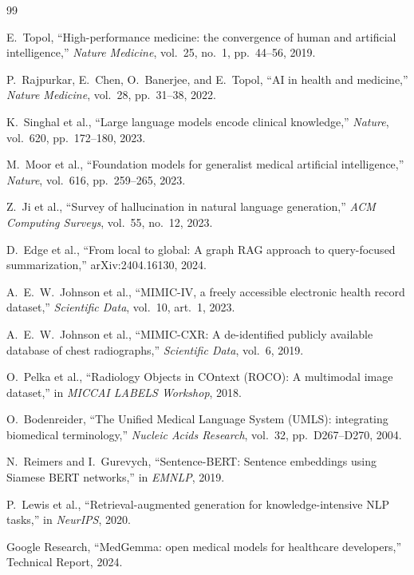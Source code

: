 \documentclass[twocolumn,10pt,main=USenglish]{asmeconf}
\begin{document}
\begin{thebibliography}{99}
\small

E.~Topol, ``High-performance medicine: the convergence of human and
artificial intelligence,'' \emph{Nature Medicine}, vol.~25, no.~1,
pp.~44--56, 2019.

P.~Rajpurkar, E.~Chen, O.~Banerjee, and E.~Topol, ``AI in health and
medicine,'' \emph{Nature Medicine}, vol.~28, pp.~31--38, 2022.

K.~Singhal et al., ``Large language models encode clinical knowledge,''
\emph{Nature}, vol.~620, pp.~172--180, 2023.

M.~Moor et al., ``Foundation models for generalist medical artificial
intelligence,'' \emph{Nature}, vol.~616, pp.~259--265, 2023.

Z.~Ji et al., ``Survey of hallucination in natural language
generation,'' \emph{ACM Computing Surveys}, vol.~55, no.~12, 2023.

D.~Edge et al., ``From local to global: A graph RAG approach to
query-focused summarization,'' arXiv:2404.16130, 2024.

A.~E.~W.~Johnson et al., ``MIMIC-IV, a freely accessible electronic
health record dataset,'' \emph{Scientific Data}, vol.~10, art.~1,
2023.

A.~E.~W.~Johnson et al., ``MIMIC-CXR: A de-identified publicly
available database of chest radiographs,'' \emph{Scientific Data},
vol.~6, 2019.

O.~Pelka et al., ``Radiology Objects in COntext (ROCO): A multimodal
image dataset,'' in \emph{MICCAI LABELS Workshop}, 2018.

O.~Bodenreider, ``The Unified Medical Language System (UMLS):
integrating biomedical terminology,'' \emph{Nucleic Acids Research},
vol.~32, pp.~D267--D270, 2004.

N.~Reimers and I.~Gurevych, ``Sentence-BERT: Sentence embeddings using
Siamese BERT networks,'' in \emph{EMNLP}, 2019.

P.~Lewis et al., ``Retrieval-augmented generation for knowledge-intensive
NLP tasks,'' in \emph{NeurIPS}, 2020.

Google Research, ``MedGemma: open medical models for healthcare
developers,'' Technical Report, 2024.


\end{thebibliography}
\end{document}
